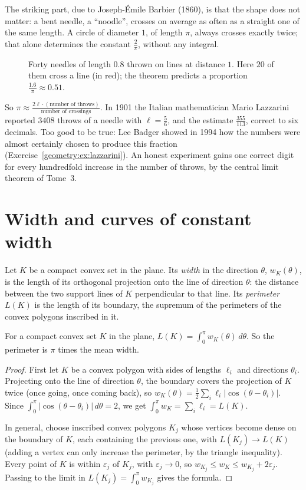 The striking part, due to Joseph-\'Emile Barbier (1860), is that the shape does not matter: a bent needle, a ``noodle'', crosses on average as often as a
straight one of the same length. A circle of diameter $1$, of length $\pi$, always crosses exactly twice; that alone determines the constant
$\frac2\pi$, without any integral.

\begin{figure}[ht]
\centering
{}
\caption{Forty needles of length $0.8$ thrown on lines at distance $1$. Here $20$ of them cross a line (in red); the theorem predicts a proportion
$\frac{1.6}\pi\approx0.51$.}
\label{geometry:fig:buffon}
\end{figure}

So $\pi\approx\frac{2\ell\cdot(\text{number of throws})}{\text{number of crossings}}$. In 1901 the Italian mathematician Mario Lazzarini reported $3408$ throws of a
needle with $\ell=\frac56$, and the estimate $\frac{355}{113}$, correct to six decimals. Too good to be true: Lee Badger showed in 1994 how the numbers were
almost certainly chosen to produce this fraction (Exercise~\ref{geometry:ex:lazzarini}). An honest experiment gains one correct digit for every hundredfold increase in
the number of throws, by the central limit theorem of Tome~3.

\section{Width and curves of constant width}

Let $K$ be a compact convex set in the plane. Its \emph{width} in the direction $\theta$, $w_K(\theta)$, is the length of its orthogonal projection onto the
line of direction $\theta$: the distance between the two support lines of $K$ perpendicular to that line. Its \emph{perimeter} $L(K)$ is the length of its
boundary, the supremum of the perimeters of the convex polygons inscribed in it.

\begin{theorem}\label{geometry:thm:cauchy}
For a compact convex set $K$ in the plane, $L(K)=\int_0^\pi w_K(\theta)\,d\theta$. So the perimeter is $\pi$ times the mean width.
\end{theorem}

\begin{proof}
First let $K$ be a convex polygon with sides of lengths $\ell_i$ and directions $\theta_i$. Projecting onto the line of direction $\theta$, the boundary covers the
projection of $K$ twice (once going, once coming back), so $w_K(\theta)=\frac12\sum_i\ell_i|\cos(\theta-\theta_i)|$. Since
$\int_0^\pi|\cos(\theta-\theta_i)|\,d\theta=2$, we get $\int_0^\pi w_K=\sum_i\ell_i=L(K)$.

In general, choose inscribed convex polygons $K_j$ whose vertices become dense on the boundary of $K$, each containing the previous one, with
$L(K_j)\to L(K)$ (adding a vertex can only increase the perimeter, by the triangle inequality). Every point of $K$ is within $\varepsilon_j$ of $K_j$, with
$\varepsilon_j\to0$, so $w_{K_j}\le w_K\le w_{K_j}+2\varepsilon_j$. Passing to the limit in $L(K_j)=\int_0^\pi w_{K_j}$ gives the formula.
\end{proof}

